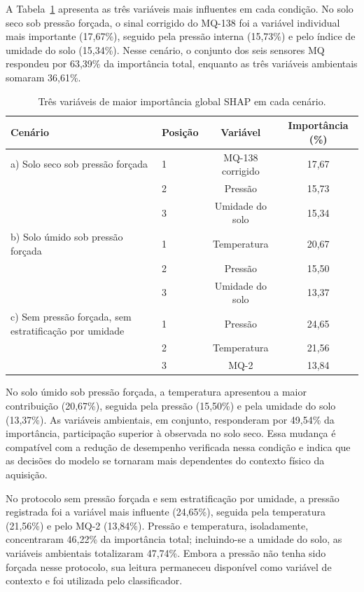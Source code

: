 A Tabela~\ref{tab:top3_shap_cenarios} apresenta as três variáveis mais
influentes em cada condição. No solo seco sob pressão forçada, o sinal
corrigido do MQ-138 foi a variável individual mais importante (17,67\%),
seguido pela pressão interna (15,73\%) e pelo índice de umidade do solo
(15,34\%). Nesse cenário, o conjunto dos seis sensores MQ respondeu por
63,39\% da importância total, enquanto as três variáveis ambientais somaram
36,61\%.

\begin{table}[H]
    \centering
    \caption{Três variáveis de maior importância global SHAP em cada cenário.}
    \label{tab:top3_shap_cenarios}
    \begin{tabular}{p{5.4cm}lcc}
        \hline
        \textbf{Cenário} & \textbf{Posição} & \textbf{Variável} &
        \textbf{Importância (\%)} \\
        \hline
        a) Solo seco sob pressão forçada
        & 1 & MQ-138 corrigido & 17,67 \\
        & 2 & Pressão & 15,73 \\
        & 3 & Umidade do solo & 15,34 \\
        \hline
        b) Solo úmido sob pressão forçada
        & 1 & Temperatura & 20,67 \\
        & 2 & Pressão & 15,50 \\
        & 3 & Umidade do solo & 13,37 \\
        \hline
        c) Sem pressão forçada, sem estratificação por umidade
        & 1 & Pressão & 24,65 \\
        & 2 & Temperatura & 21,56 \\
        & 3 & MQ-2 & 13,84 \\
        \hline
    \end{tabular}
\end{table}

No solo úmido sob pressão forçada, a temperatura apresentou a maior
contribuição (20,67\%), seguida pela pressão (15,50\%) e pela umidade do solo
(13,37\%). As variáveis ambientais, em conjunto, responderam por 49,54\% da
importância, participação superior à observada no solo seco. Essa mudança é
compatível com a redução de desempenho verificada nessa condição e indica
que as decisões do modelo se tornaram mais dependentes do contexto físico da
aquisição.

No protocolo sem pressão forçada e sem estratificação por umidade, a pressão
registrada foi a variável mais influente (24,65\%), seguida pela temperatura
(21,56\%) e pelo MQ-2 (13,84\%). Pressão e temperatura, isoladamente,
concentraram 46,22\% da importância total; incluindo-se a umidade do solo, as
variáveis ambientais totalizaram 47,74\%. Embora a pressão não tenha sido
forçada nesse protocolo, sua leitura permaneceu disponível como variável de
contexto e foi utilizada pelo classificador.

